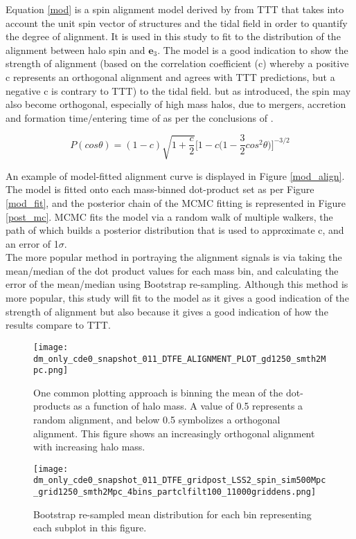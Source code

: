 \documentclass[a4paper,fleqn,usenatbib]{mnras}
\begin{document}
Equation \ref{mod} is a spin alignment model derived by \citet{Lee_11} from TTT that takes into account the unit spin vector of structures and the tidal field in order to quantify the degree of alignment. It is used in this study to fit to the distribution of the alignment between halo spin and $\textbf{e}_{3}$. The model is a good indication to show the strength of alignment (based on the correlation coefficient (c) whereby a positive c represents an orthogonal alignment and agrees with TTT predictions, but a negative c is contrary to TTT) to the tidal field. but as introduced, the spin may also become orthogonal, especially of high mass halos, due to mergers, accretion and formation time/entering time of as per the conclusions of \citet{Wang_17}.
\begin{ceqn}
\begin{equation}
\textit{P}(cos\theta)=(1-c)\sqrt{1+\frac{c}{2}}\Big[1-c\Big(1-\frac{3}{2}cos^{2}\theta\Big)\Big]^{-3/2} \label{mod}
\end{equation}
\end{ceqn}

An example of model-fitted alignment curve is displayed in Figure \ref{mod_align}. The model is fitted onto each mass-binned dot-product set as per Figure \ref{mod_fit}, and the posterior chain of the MCMC fitting is represented in Figure \ref{post_mc}. MCMC fits the model via a random walk of multiple walkers, the path of which builds a posterior distribution that is used to approximate c, and an error of 1$\sigma$.
\\
The more popular method in portraying the alignment signals is via taking the mean/median of the dot product values for each mass bin, and calculating the error of the mean/median using Bootstrap re-sampling. Although this method is more popular, this study will fit to the model as it gives a good indication of the strength of alignment but also because it gives a good indication of how the results compare to TTT.

\begin{figure}
\centering
\texttt{[image: dm\_only\_cde0\_snapshot\_011\_DTFE\_ALIGNMENT\_PLOT\_gd1250\_smth2Mpc.png]}
\caption{One common plotting approach is binning the mean of the dot-products as a function of halo mass. A value of 0.5 represents a random alignment, and below 0.5 symbolizes a orthogonal alignment. This figure shows an increasingly orthogonal alignment with increasing halo mass.}\label{mean_spin}
\end{figure}
\begin{figure}
\centering
\texttt{[image: dm\_only\_cde0\_snapshot\_011\_DTFE\_gridpost\_LSS2\_spin\_sim500Mpc\_grid1250\_smth2Mpc\_4bins\_partclfilt100\_11000griddens.png]}
\caption{Bootstrap re-sampled mean distribution for each bin representing each subplot in this figure.}\label{bootstrap_post} 
\end{figure}
\end{document}
